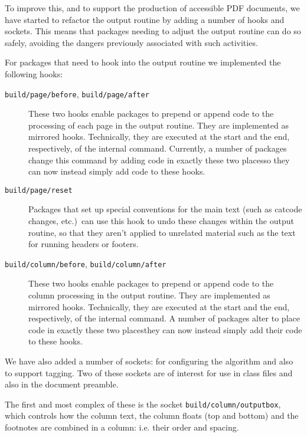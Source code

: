 \documentclass{ltnews}
\providecommand\Dash {\unskip \textemdash}
\providecommand\hook[1]{\texttt{#1}}
\providecommand\socket[1]{\texttt{#1}}
\begin{document}
To improve this, and to support the production of accessible PDF
documents, we have started to refactor the output routine by adding a
number of hooks and sockets.  This means that packages needing to
adjust the output routine can do so safely, avoiding the dangers
previously associated with such activities.


For packages that need to hook into the output routine we implemented
the following hooks:
\begin{description}

\item[\hook{build/page/before}, \hook{build/page/after}]

   These two hooks enable packages to prepend or append code to the
   processing of each page in the output routine. They are implemented
   as mirrored hooks.  Technically, they are executed at the start and
   the end, respectively, of the internal \LaTeXe{} 
   command.  Currently, a number of packages change this command by
   adding code in exactly these two places\Dash so they can now
   instead simply add code to these hooks.

 \item[\hook{build/page/reset}]

   Packages that set up special conventions for the main text (such as
   catcode changes, etc.)\ can use this hook to undo these changes
   within the output routine, so that they aren't applied to unrelated
   material such as the text for running headers or footers.

\item[\hook{build/column/before}, \hook{build/column/after}]

  These two hooks enable packages to prepend or append code to the
  column processing in the output routine. They are implemented as
  mirrored hooks.  Technically, they are executed at the start and the
  end, respectively, of the internal \LaTeXe{}  command.
  A number of packages alter  to place code in exactly
  these two places\Dash they can now instead simply add their code to
  these hooks.
  
\end{description}

We have also added a number of sockets: for configuring the algorithm
and also to support tagging.  Two of these sockets are of interest for
use in class files and also in the document preamble.

The first and most complex of these is the socket
\socket{build/column/outputbox}, which controls how the column text,
the column floats (top and bottom) and the footnotes are combined in a
column: i.e. their order and spacing.
\end{document}
